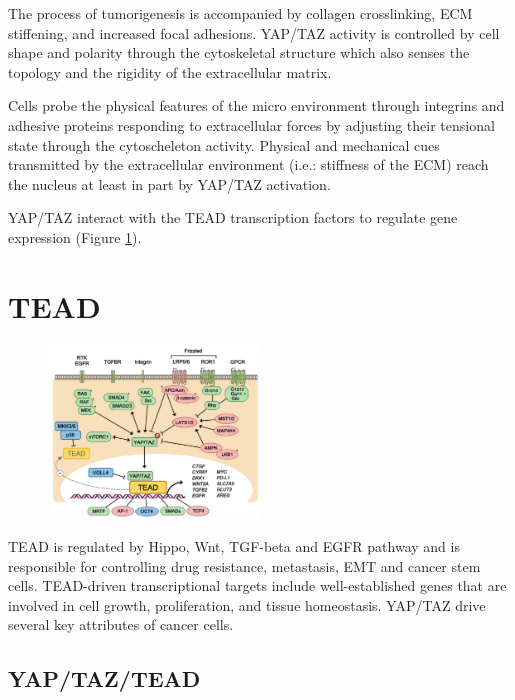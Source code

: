 The process of tumorigenesis is accompanied by collagen crosslinking, ECM stiffening, and increased focal adhesions. YAP/TAZ activity is controlled by cell shape and polarity through the cytoskeletal structure which also senses the topology and the rigidity of the extracellular matrix.

Cells probe the physical features of the micro environment through integrins and adhesive proteins responding to extracellular forces by adjusting their tensional state through the cytoscheleton activity. Physical and mechanical cues transmitted by the extracellular environment (i.e.: stiffness of the ECM) reach the nucleus at least in part by YAP/TAZ activation.

YAP/TAZ interact with the TEAD transcription factors to regulate gene expression (Figure \ref{fig:tead}).

\hypertarget{tead}{%
\section{TEAD}\label{tead}}

\begin{figure}
\centering
\includegraphics[width=0.5\textwidth]{../_resources/Screen_Shot_2022-11-13_at_19-48-01.png}
\caption{}
\label{fig:tead}
\end{figure}

TEAD is regulated by Hippo, Wnt, TGF-beta and EGFR pathway and is responsible for controlling drug resistance, metastasis, EMT and cancer stem cells. TEAD-driven transcriptional targets include well-established genes that are involved in cell growth, proliferation, and tissue homeostasis. YAP/TAZ drive several key attributes of cancer cells.

\hypertarget{yaptaztead}{%
\subsection{YAP/TAZ/TEAD}\label{yaptaztead}}

